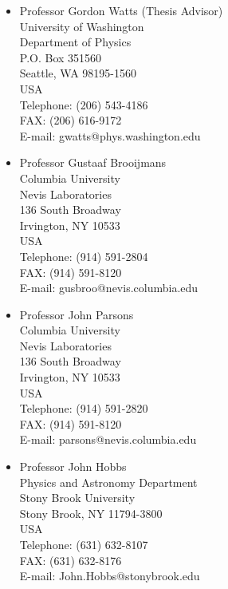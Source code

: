 \documentclass[12pt]{article}
\begin{document}
\begin{itemize}
\item{Professor Gordon Watts (Thesis Advisor)\\
University of Washington\\
Department of Physics\\
P.O. Box 351560\\
Seattle, WA 98195-1560\\ 
USA\\[0.1cm]
Telephone: (206) 543-4186\\
FAX:\phantom{iiiiiiiii} (206) 616-9172\\
E-mail: gwatts@phys.washington.edu\\
}

\item{Professor Gustaaf Brooijmans\\
Columbia University\\
Nevis Laboratories \\
136 South Broadway\\
Irvington, NY 10533\\
USA\\[0.1cm]
Telephone:  (914) 591-2804 \\
FAX:\phantom{iiiiiiiii} (914) 591-8120\\
E-mail: gusbroo@nevis.columbia.edu\\
}

\item{Professor John Parsons\\
Columbia University\\
Nevis Laboratories \\
136 South Broadway\\
Irvington, NY 10533\\
USA\\[0.1cm]
Telephone:  (914) 591-2820 \\
FAX:\phantom{iiiiiiiii} (914) 591-8120\\
E-mail: parsons@nevis.columbia.edu\\
}

\item{Professor John Hobbs \\
Physics and Astronomy Department \\
Stony Brook University \\
Stony Brook, NY 11794-3800 \\
USA \\[0.1cm]
Telephone: (631) 632-8107 \\
FAX:\phantom{iiiiiiiii} (631) 632-8176\\
E-mail: John.Hobbs@stonybrook.edu \\
}
\end{itemize}
\end{document}
